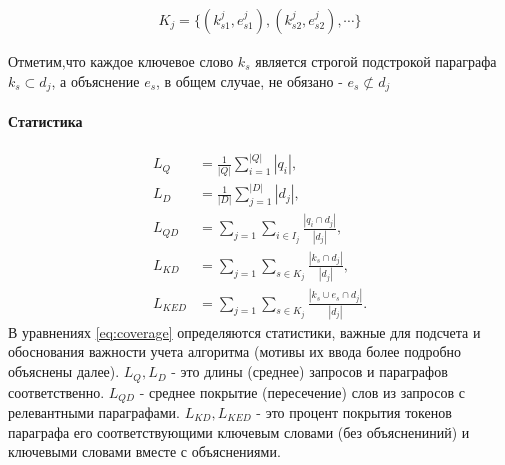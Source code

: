 \begin{align}
K_j = \{(k^j_{s1}, e^j_{s1}), (k^j_{s2}, e^j_{s2}), \cdots\}
\end{align}

Отметим,что каждое ключевое слово $k_s$ является строгой подстрокой параграфа $k_s \subset d_j$, а объяснение $e_s$, в общем случае, не обязано - $e_s \not\subset d_j$
\paragraph{Статистика}
\begin{equation}\label{eq:coverage}
    \begin{aligned}
        L_{Q} &= \frac{1}{|Q|}\sum_{i=1}^{|Q|} |q_i|, \\
        L_{D} &= \frac{1}{|D|}\sum_{j=1}^{|D|} |d_j|, \\
        L_{QD} &= \sum_{j=1} \sum_{i \in I_j} \frac{|q_i \cap d_j|}{|d_j|}, \\
        L_{KD} &= \sum_{j=1} \sum_{s \in K_j} \frac{|k_s \cap d_j|}{|d_j|}, \\
        L_{KED} &= \sum_{j=1} \sum_{s \in K_j} \frac{|k_s \cup e_s \cap d_j|}{|d_j|}.
    \end{aligned}
\end{equation}
В уравнениях \eqref{eq:coverage} определяются статистики, важные для подсчета и обоснования важности учета алгоритма (мотивы их ввода более подробно объяснены далее). 
$L_{Q}, L_{D}$ - это длины (среднее) запросов и параграфов соответственно. $L_{QD}$ - среднее покрытие (пересечение) слов из запросов с релевантными параграфами.
$L_{KD}, L_{KED}$ - это процент покрытия токенов параграфа его соответствующими ключевым словами (без объяснениний) и ключевыми словами вместе с объяснениями.
